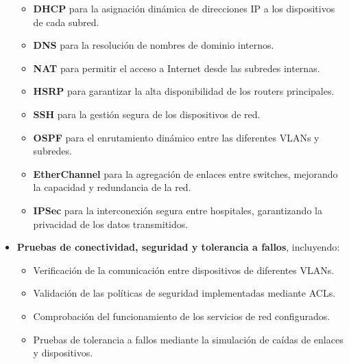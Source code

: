 \begin{itemize}
    \begin{itemize}
        \item \textbf{\acs{DHCP}} para la asignación dinámica de direcciones \acs{IP} a los dispositivos de cada subred.
        \item \textbf{\acs{DNS}} para la resolución de nombres de dominio internos.
        \item \textbf{\acs{NAT}} para permitir el acceso a Internet desde las subredes internas.
        \item \textbf{\acs{HSRP}} para garantizar la alta disponibilidad de los routers principales.
        \item \textbf{\acs{SSH}} para la gestión segura de los dispositivos de red.
        \item \textbf{\acs{OSPF}} para el enrutamiento dinámico entre las diferentes \acs{VLAN}s y subredes.
        \item \textbf{EtherChannel} para la agregación de enlaces entre switches, mejorando la capacidad y redundancia de la red.
        \item \textbf{IPSec} para la interconexión segura entre hospitales, garantizando la privacidad de los datos transmitidos.
    \end{itemize}
    \item \textbf{Pruebas de conectividad, seguridad y tolerancia a fallos}, incluyendo:
    \begin{itemize}
        \item Verificación de la comunicación entre dispositivos de diferentes \acs{VLAN}s.
        \item Validación de las políticas de seguridad implementadas mediante \acs{ACL}s.
        \item Comprobación del funcionamiento de los servicios de red configurados.
        \item Pruebas de tolerancia a fallos mediante la simulación de caídas de enlaces y dispositivos.
    \end{itemize}
\end{itemize}

